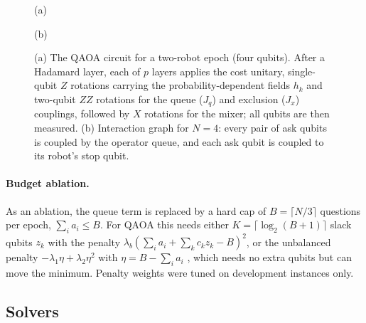 \documentclass[a4paper,fleqn]{cas-dc}
\begin{document}
\begin{figure}
\begin{minipage}[b]{0.66\textwidth}
\small (a)
\end{minipage}\hfill
\begin{minipage}[b]{0.3\textwidth}\centering
{}

\small (b)
\end{minipage}
\caption{(a) The QAOA circuit for a two-robot epoch (four qubits). After a Hadamard layer, each of $p$ layers applies the cost unitary, single-qubit $Z$ rotations carrying the probability-dependent fields $h_k$ and two-qubit $ZZ$ rotations for the queue ($J_q$) and exclusion ($J_x$) couplings, followed by $X$ rotations for the mixer; all qubits are then measured. (b) Interaction graph for $N = 4$: every pair of ask qubits is coupled by the operator queue, and each ask qubit is coupled to its robot's stop qubit.}
\label{fig:circuit}
\end{figure}

\paragraph{Budget ablation.} As an ablation, the queue term is replaced by a hard cap of $B = \lceil N/3\rceil$ questions per epoch, $\sum_i a_i \le B$. For QAOA this needs either $K = \lceil\log_2(B+1)\rceil$ slack qubits $z_k$ with the penalty $\lambda_b(\sum_i a_i + \sum_k c_k z_k - B)^2$, or the unbalanced penalty $-\lambda_1\eta + \lambda_2\eta^2$ with $\eta = B - \sum_i a_i$ \citep{montanez2024unbalanced}, which needs no extra qubits but can move the minimum. Penalty weights were tuned on development instances only.

\subsection{Solvers}
\label{sec:solvers}
\end{document}
